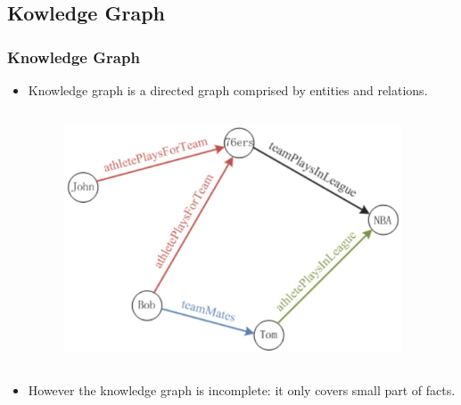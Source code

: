 \documentclass[pdf,10pt]{beamer}
\begin{document}
\subsection{Kowledge Graph}
\begin{frame}
\frametitle{Knowledge Graph}
\begin{itemize}
	\item Knowledge graph is a directed graph comprised by entities and relations. 

	\begin{columns}[onlytextwidth]
		\begin{column}{0.45\textwidth}
			\begin{figure}
				\includegraphics[width=.45\textwidth,natwidth=610,natheight=610]{2.eps}
			\end{figure}
		\end{column}
		\begin{column}{0.45\textwidth}
			\begin{itemize}
			\end{itemize}
		\end{column}
	\end{columns}
	\item However the knowledge graph is incomplete: it only covers small part of facts.
	\end{itemize}
\end{frame}
\end{document}
